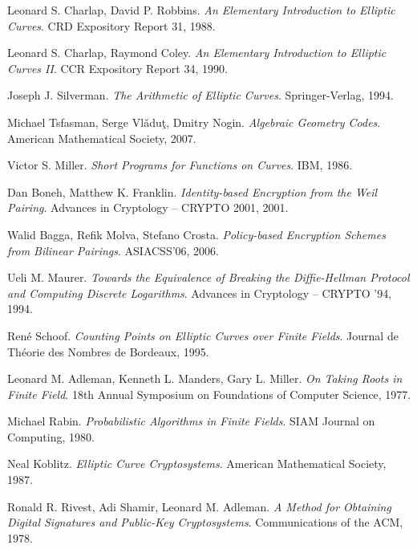 \begin{thebibliography}{99}

    Leonard S. Charlap, David P. Robbins.
    \emph{An Elementary Introduction to Elliptic Curves}.
    CRD Expository Report 31, 1988.

    Leonard S. Charlap, Raymond Coley.
    \emph{An Elementary Introduction to Elliptic Curves II}.
    CCR Expository Report 34, 1990.

    Joseph J. Silverman.
    \emph{The Arithmetic of Elliptic Curves}.
    Springer-Verlag, 1994.

    Michael Tsfasman, Serge  Vl\v{a}du\c{t}, Dmitry Nogin.
    \emph{Algebraic Geometry Codes}.
    American Mathematical Society, 2007.

    Victor S. Miller.
    \emph{Short Programs for Functions on Curves}.
    IBM, 1986.

    Dan Boneh, Matthew K. Franklin.
    \emph{Identity-based Encryption from the Weil Pairing}.
    Advances in Cryptology -- CRYPTO 2001, 2001.

    Walid Bagga, Refik Molva, Stefano Crosta.
    \emph{Policy-based Encryption Schemes from Bilinear Pairings}.
    ASIACSS'06, 2006.

    Ueli M. Maurer.
    \emph{Towards the Equivalence of Breaking the Diffie-Hellman Protocol
        and Computing Discrete Logarithms}.
    Advances in Cryptology -- CRYPTO '94, 1994.

    René Schoof.
    \emph{Counting Points on Elliptic Curves over Finite Fields}.
    Journal de Théorie des Nombres de Bordeaux, 1995.

    Leonard M. Adleman, Kenneth L. Manders, Gary L. Miller.
    \emph{On Taking Roots in Finite Field}.
    18th Annual Symposium on Foundations of Computer Science, 1977.

    Michael Rabin.
    \emph{Probabilistic Algorithms in Finite Fields}.
    SIAM Journal on Computing, 1980.

    Neal Koblitz.
    \emph{Elliptic Curve Cryptosystems}.
    American Mathematical Society, 1987.

    Ronald R. Rivest, Adi Shamir, Leonard M. Adleman.
    \emph{A Method for Obtaining Digital Signatures
        and Public-Key Cryptosystems}.
    Communications of the ACM, 1978.


\end{thebibliography}
